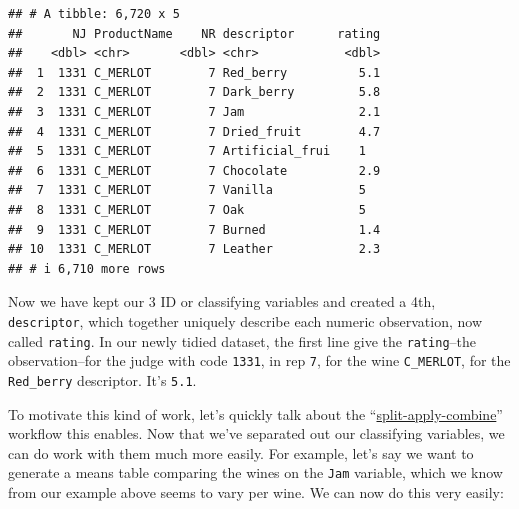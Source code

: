 \documentclass[
]{book}
\begin{document}
\begin{verbatim}
## # A tibble: 6,720 x 5
##       NJ ProductName    NR descriptor      rating
##    <dbl> <chr>       <dbl> <chr>            <dbl>
##  1  1331 C_MERLOT        7 Red_berry          5.1
##  2  1331 C_MERLOT        7 Dark_berry         5.8
##  3  1331 C_MERLOT        7 Jam                2.1
##  4  1331 C_MERLOT        7 Dried_fruit        4.7
##  5  1331 C_MERLOT        7 Artificial_frui    1  
##  6  1331 C_MERLOT        7 Chocolate          2.9
##  7  1331 C_MERLOT        7 Vanilla            5  
##  8  1331 C_MERLOT        7 Oak                5  
##  9  1331 C_MERLOT        7 Burned             1.4
## 10  1331 C_MERLOT        7 Leather            2.3
## # i 6,710 more rows
\end{verbatim}

Now we have kept our 3 ID or classifying variables and created a 4th, \texttt{descriptor}, which together uniquely describe each numeric observation, now called \texttt{rating}. In our newly tidied dataset, the first line give the \texttt{rating}--the observation--for the judge with code \texttt{1331}, in rep \texttt{7}, for the wine \texttt{C\_MERLOT}, for the \texttt{Red\_berry} descriptor. It's \texttt{5.1}.

To motivate this kind of work, let's quickly talk about the ``\href{https://www.jstatsoft.org/article/view/v040i01}{split-apply-combine}'' workflow this enables. Now that we've separated out our classifying variables, we can do work with them much more easily. For example, let's say we want to generate a means table comparing the wines on the \texttt{Jam} variable, which we know from our example above seems to vary per wine. We can now do this very easily:
\end{document}

